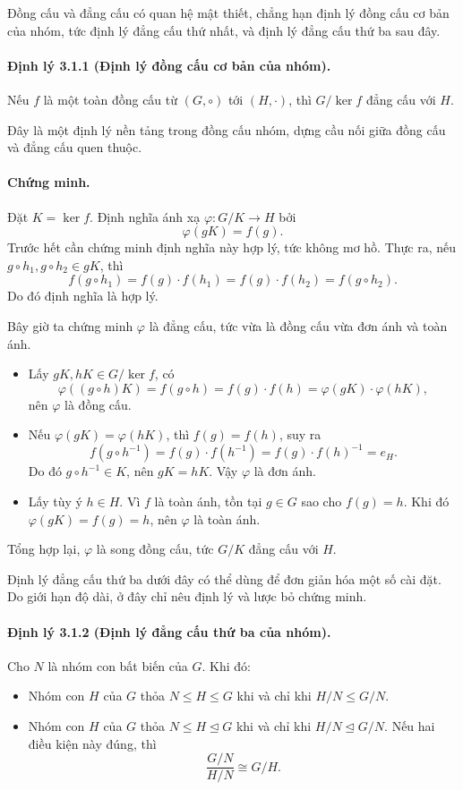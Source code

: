 \documentclass[11pt]{article}
\begin{document}
Đồng cấu và đẳng cấu có quan hệ mật thiết, chẳng hạn định lý đồng cấu cơ bản
của nhóm, tức định lý đẳng cấu thứ nhất, và định lý đẳng cấu thứ ba sau đây.

\paragraph{Định lý 3.1.1 (Định lý đồng cấu cơ bản của nhóm).}
Nếu \(f\) là một toàn đồng cấu từ \((G,\circ)\) tới \((H,\cdot)\), thì
\(G/\ker f\) đẳng cấu với \(H\).

Đây là một định lý nền tảng trong đồng cấu nhóm, dựng cầu nối giữa đồng cấu và
đẳng cấu quen thuộc.

\paragraph{Chứng minh.}
Đặt \(K=\ker f\). Định nghĩa ánh xạ \(\varphi:G/K\to H\) bởi
\[
  \varphi(gK)=f(g).
\]
Trước hết cần chứng minh định nghĩa này hợp lý, tức không mơ hồ. Thực ra, nếu
\(g\circ h_1,g\circ h_2\in gK\), thì
\[
  f(g\circ h_1)=f(g)\cdot f(h_1)=f(g)\cdot f(h_2)=f(g\circ h_2).
\]
Do đó định nghĩa là hợp lý.

Bây giờ ta chứng minh \(\varphi\) là đẳng cấu, tức vừa là đồng cấu vừa đơn ánh
và toàn ánh.
\begin{itemize}
  \item Lấy \(gK,hK\in G/\ker f\), có
  \[
    \varphi((g\circ h)K)
    =f(g\circ h)
    =f(g)\cdot f(h)
    =\varphi(gK)\cdot\varphi(hK),
  \]
  nên \(\varphi\) là đồng cấu.
  \item Nếu \(\varphi(gK)=\varphi(hK)\), thì \(f(g)=f(h)\), suy ra
  \[
    f(g\circ h^{-1})=f(g)\cdot f(h^{-1})
    =f(g)\cdot f(h)^{-1}=e_H.
  \]
  Do đó \(g\circ h^{-1}\in K\), nên \(gK=hK\). Vậy \(\varphi\) là đơn ánh.
  \item Lấy tùy ý \(h\in H\). Vì \(f\) là toàn ánh, tồn tại \(g\in G\) sao cho
  \(f(g)=h\). Khi đó \(\varphi(gK)=f(g)=h\), nên \(\varphi\) là toàn ánh.
\end{itemize}

Tổng hợp lại, \(\varphi\) là song đồng cấu, tức \(G/K\) đẳng cấu với \(H\).

Định lý đẳng cấu thứ ba dưới đây có thể dùng để đơn giản hóa một số cài đặt.
Do giới hạn độ dài, ở đây chỉ nêu định lý và lược bỏ chứng minh.

\paragraph{Định lý 3.1.2 (Định lý đẳng cấu thứ ba của nhóm).}
Cho \(N\) là nhóm con bất biến của \(G\). Khi đó:
\begin{itemize}
  \item Nhóm con \(H\) của \(G\) thỏa \(N\le H\le G\) khi và chỉ khi
  \(H/N\le G/N\).
  \item Nhóm con \(H\) của \(G\) thỏa \(N\le H\trianglelefteq G\) khi và chỉ
  khi \(H/N\trianglelefteq G/N\). Nếu hai điều kiện này đúng, thì
  \[
    \frac{G/N}{H/N}\cong G/H.
  \]
\end{itemize}
\end{document}
